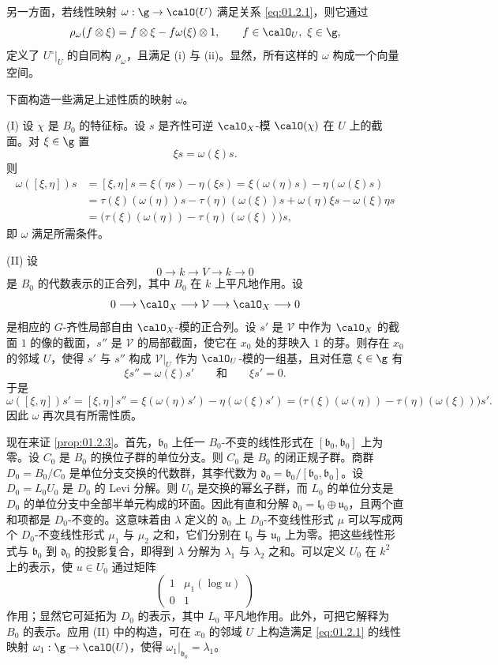 另一方面，若线性映射 $\omega:\g\to\calO(U)$ 满足关系 \eqref{eq:01.2.1}，则它通过
$$\rho_\omega(f\otimes\xi)=f\otimes\xi-f\omega(\xi)\otimes 1,\qquad f\in\calO_U,\ \xi\in\g,$$
定义了 $U^\circ|_U$ 的自同构 $\rho_\omega$，且满足 (i) 与 (ii)。显然，所有这样的 $\omega$ 构成一个向量空间。

下面构造一些满足上述性质的映射 $\omega$。

(I) 设 $\chi$ 是 $B_0$ 的特征标。设 $s$ 是齐性可逆 $\calO_X$-模 $\calO(\chi)$ 在 $U$ 上的截面。对 $\xi\in\g$ 置
$$\xi s=\omega(\xi)s.$$
则
\begin{align*}
\omega([\xi,\eta])s&=[\xi,\eta]s=\xi(\eta s)-\eta(\xi s)=\xi(\omega(\eta)s)-\eta(\omega(\xi)s)\\
&=\tau(\xi)(\omega(\eta))s-\tau(\eta)(\omega(\xi))s+\omega(\eta)\xi s-\omega(\xi)\eta s\\
&=\bigl(\tau(\xi)(\omega(\eta))-\tau(\eta)(\omega(\xi))\bigr)s,
\end{align*}
即 $\omega$ 满足所需条件。

(II) 设
$$0\longrightarrow k\longrightarrow V\longrightarrow k\longrightarrow 0$$
是 $B_0$ 的代数表示的正合列，其中 $B_0$ 在 $k$ 上平凡地作用。设
$$0\longrightarrow\calO_X\longrightarrow\mathcal{V}\longrightarrow\calO_X\longrightarrow 0$$
是相应的 $G$-齐性局部自由 $\calO_X$-模的正合列。设 $s'$ 是 $\mathcal{V}$ 中作为 $\calO_X$ 的截面 $1$ 的像的截面，$s''$ 是 $\mathcal{V}$ 的局部截面，使它在 $x_0$ 处的芽映入 $1$ 的芽。则存在 $x_0$ 的邻域 $U$，使得 $s'$ 与 $s''$ 构成 $\mathcal{V}|_U$ 作为 $\calO_U$-模的一组基，且对任意 $\xi\in\g$ 有
$$\xi s''=\omega(\xi)s'\qquad\text{和}\qquad \xi s'=0.$$
于是
$$\omega([\xi,\eta])s'=[\xi,\eta]s''=\xi(\omega(\eta)s')-\eta(\omega(\xi)s')=\bigl(\tau(\xi)(\omega(\eta))-\tau(\eta)(\omega(\xi))\bigr)s'.$$
因此 $\omega$ 再次具有所需性质。

现在来证 \ref{prop:01.2.3}。首先，$\mathfrak{b}_0$ 上任一 $B_0$-不变的线性形式在 $[\mathfrak{b}_0,\mathfrak{b}_0]$ 上为零。设 $C_0$ 是 $B_0$ 的换位子群的单位分支。则 $C_0$ 是 $B_0$ 的闭正规子群。商群 $D_0=B_0/C_0$ 是单位分支交换的代数群，其李代数为 $\mathfrak{d}_0=\mathfrak{b}_0/[\mathfrak{b}_0,\mathfrak{b}_0]$。设 $D_0=L_0U_0$ 是 $D_0$ 的 Levi 分解。则 $U_0$ 是交换的幂幺子群，而 $L_0$ 的单位分支是 $D_0$ 的单位分支中全部半单元构成的环面。因此有直和分解 $\mathfrak{d}_0=\mathfrak{l}_0\oplus\mathfrak{u}_0$，且两个直和项都是 $D_0$-不变的。这意味着由 $\lambda$ 定义的 $\mathfrak{d}_0$ 上 $D_0$-不变线性形式 $\mu$ 可以写成两个 $D_0$-不变线性形式 $\mu_1$ 与 $\mu_2$ 之和，它们分别在 $\mathfrak{l}_0$ 与 $\mathfrak{u}_0$ 上为零。把这些线性形式与 $\mathfrak{b}_0$ 到 $\mathfrak{d}_0$ 的投影复合，即得到 $\lambda$ 分解为 $\lambda_1$ 与 $\lambda_2$ 之和。可以定义 $U_0$ 在 $k^2$ 上的表示，使 $u\in U_0$ 通过矩阵
$$\begin{pmatrix}1&\mu_1(\log u)\\ 0&1\end{pmatrix}$$
作用；显然它可延拓为 $D_0$ 的表示，其中 $L_0$ 平凡地作用。此外，可把它解释为 $B_0$ 的表示。应用 (II) 中的构造，可在 $x_0$ 的邻域 $U$ 上构造满足 \eqref{eq:01.2.1} 的线性映射 $\omega_1:\g\to\calO(U)$，使得 $\omega_1|_{\mathfrak{b}_0}=\lambda_1$。

